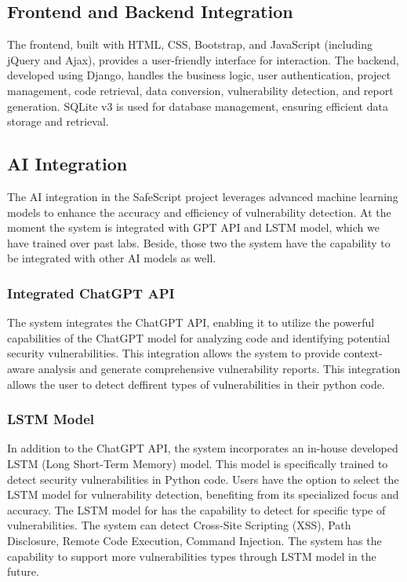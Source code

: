\subsection{Frontend and Backend Integration}
The frontend, built with HTML, CSS, Bootstrap, and JavaScript (including jQuery and Ajax), provides a user-friendly interface for interaction. 
The backend, developed using Django, handles the business logic, user authentication, project management, code retrieval, data conversion, vulnerability detection, and report generation. 
SQLite v3 is used for database management, ensuring efficient data storage and retrieval.

\subsection{AI Integration}
The AI integration in the SafeScript project leverages advanced machine learning models to enhance the accuracy and efficiency of vulnerability detection. 
At the moment the system is integrated with GPT API and LSTM model, which we have trained over past labs. 
Beside, those two the system have the capability to be integrated with other AI models as well.

\subsubsection{Integrated ChatGPT API}
The system integrates the ChatGPT API, enabling it to utilize the powerful capabilities of the ChatGPT model for analyzing code and identifying potential security vulnerabilities. 
This integration allows the system to provide context-aware analysis and generate comprehensive vulnerability reports.
This integration allows the user to detect deffirent types of vulnerabilities in their python code.

\subsubsection{LSTM Model}
In addition to the ChatGPT API, the system incorporates an in-house developed LSTM (Long Short-Term Memory) model. 
This model is specifically trained to detect security vulnerabilities in Python code. 
Users have the option to select the LSTM model for vulnerability detection, benefiting from its specialized focus and accuracy.
The LSTM model for has the capability to detect for specific type of vulnerabilities. The system can detect Cross-Site Scripting (XSS), Path Disclosure, Remote Code Execution, Command Injection.
The system has the capability to support more vulnerabilities types through LSTM model in the future.

